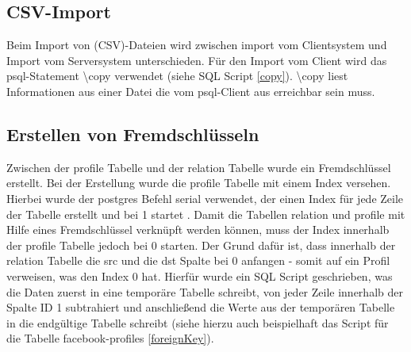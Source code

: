 \subsection{CSV-Import}
Beim Import von (CSV)-Dateien wird zwischen import vom Clientsystem und  Import vom Serversystem unterschieden. 
Für den Import vom Client wird das psql-Statement \textbackslash copy verwendet (siehe SQL Script \ref{copy}). \textbackslash copy liest Informationen aus einer Datei die vom psql-Client aus erreichbar sein muss. \cite{postgres2018}

\subsection{Erstellen von Fremdschlüsseln}
Zwischen der profile Tabelle und der relation Tabelle wurde ein Fremdschlüssel erstellt. Bei der Erstellung wurde die profile Tabelle
mit einem Index versehen. Hierbei wurde der postgres Befehl serial verwendet, der einen Index für jede Zeile der Tabelle erstellt und bei 1 startet . Damit die Tabellen
relation und profile mit Hilfe eines Fremdschlüssel verknüpft werden können, muss der Index innerhalb der profile Tabelle jedoch bei 0 starten. Der Grund dafür ist, dass
innerhalb der relation Tabelle die src und die dst Spalte bei 0 anfangen - somit auf ein Profil verweisen, was den Index 0 hat. Hierfür wurde ein SQL Script geschrieben,
was die Daten zuerst in eine temporäre Tabelle schreibt, von jeder Zeile innerhalb der Spalte ID 1 subtrahiert und anschließend die Werte aus der temporären Tabelle
in die endgültige Tabelle schreibt (siehe hierzu auch beispielhaft das Script für die Tabelle facebook-profiles \ref{foreignKey}).

